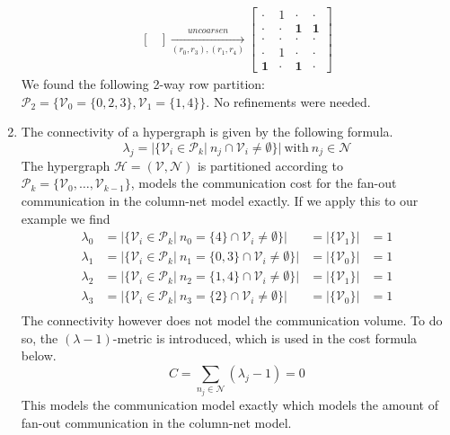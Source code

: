 \documentclass[../main.tex]{subfiles}
\begin{document}
\begin{solution}
\begin{enumerate}
\begin{equation}
\begin{multlined}
\begin{bmatrix}
		\end{bmatrix}
		\xrightarrow[(r_0,r_3),(r_1,r_4)]{uncoarsen}
		\begin{bmatrix}
		\cdot & 1 & \cdot & \cdot \\
		\cdot & \cdot & \mathbf{1} & \mathbf{1} \\
		\cdot & \cdot & \cdot & \cdot \\
		\cdot & 1 & \cdot & \cdot \\
		\mathbf{1} & \cdot & \mathbf{1} & \cdot
		\end{bmatrix}
	\end{multlined}
	\end{equation}
	We found the following 2-way row partition: $\mathcal{P}_2 = \{\mathcal{V}_0 = \{0,2,3\}, \mathcal{V}_1 = \{1,4\}\}$. No refinements were needed.
	\item
		The connectivity of a hypergraph is given by the following formula.
		\begin{equation}
			\lambda_j = | \{\mathcal{V}_i \in \mathcal{P}_k |~ n_j \cap \mathcal{V}_i \neq \emptyset \} | ~\text{with}~n_j \in \mathcal{N}
		\end{equation}
		The hypergraph $\mathcal{H}=(\mathcal{V},\mathcal{N})$ is partitioned according to $\mathcal{P}_k = \{\mathcal{V}_0, \ldots, \mathcal{V}_{k-1}\}$, models the communication cost for the fan-out communication in the column-net model exactly. If we apply this to our example we find
		\begin{equation}
		\begin{array}{llll}
			\lambda_0  & = | \{ \mathcal{V}_i \in \mathcal{P}_k |~ n_0 = \{4\} \cap \mathcal{V}_i \neq \emptyset \} | & = | \{ \mathcal{V}_1 \} | & = 1 \\
			\lambda_1  & = | \{ \mathcal{V}_i \in \mathcal{P}_k |~ n_1 = \{0,3\} \cap \mathcal{V}_i \neq \emptyset \} | & = | \{ \mathcal{V}_0 \} | & = 1 \\
			\lambda_2  & = | \{ \mathcal{V}_i \in \mathcal{P}_k |~ n_2 = \{1,4\} \cap \mathcal{V}_i \neq \emptyset \} | & = | \{ \mathcal{V}_1 \} | & = 1 \\
			\lambda_3  & = | \{ \mathcal{V}_i \in \mathcal{P}_k |~ n_3 = \{2\} \cap \mathcal{V}_i \neq \emptyset \} | & = | \{ \mathcal{V}_0 \} | & = 1 \\
		\end{array}
		\end{equation}
		The connectivity however does not model the communication volume. To do so, the $(\lambda-1)$-metric is introduced, which is used in the cost formula below.
		\begin{equation}
			C = \sum_{n_j \in \mathcal{N}} (\lambda_j - 1) = 0
		\end{equation}
		This models the communication model exactly which models the amount of fan-out communication in the column-net model.
\end{enumerate}

\end{solution}
\end{document}
